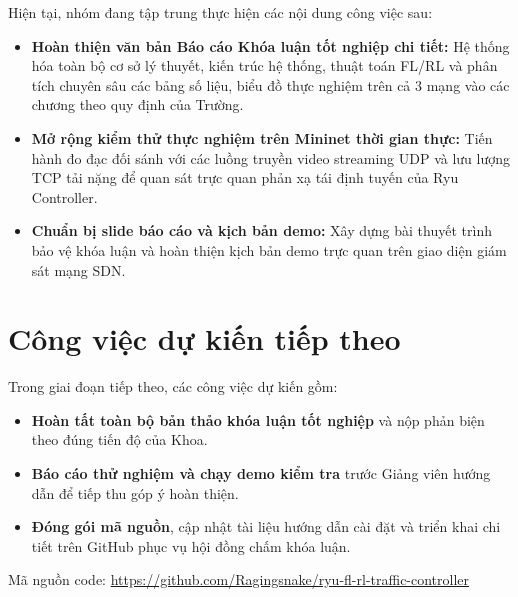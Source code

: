 \documentclass[11pt,a4paper]{article}
\begin{document}
Hiện tại, nhóm đang tập trung thực hiện các nội dung công việc sau:
\begin{itemize}[leftmargin=1.5em, itemsep=0.3ex]
    \item \textbf{Hoàn thiện văn bản Báo cáo Khóa luận tốt nghiệp chi tiết:} Hệ thống hóa toàn bộ cơ sở lý thuyết, kiến trúc hệ thống, thuật toán FL/RL và phân tích chuyên sâu các bảng số liệu, biểu đồ thực nghiệm trên cả 3 mạng vào các chương theo quy định của Trường.
    \item \textbf{Mở rộng kiểm thử thực nghiệm trên Mininet thời gian thực:} Tiến hành đo đạc đối sánh với các luồng truyền video streaming UDP và lưu lượng TCP tải nặng để quan sát trực quan phản xạ tái định tuyến của Ryu Controller.
    \item \textbf{Chuẩn bị slide báo cáo và kịch bản demo:} Xây dựng bài thuyết trình bảo vệ khóa luận và hoàn thiện kịch bản demo trực quan trên giao diện giám sát mạng SDN.
\end{itemize}

\section{Công việc dự kiến tiếp theo}

Trong giai đoạn tiếp theo, các công việc dự kiến gồm:
\begin{itemize}[leftmargin=1.5em, itemsep=0.3ex]
    \item \textbf{Hoàn tất toàn bộ bản thảo khóa luận tốt nghiệp} và nộp phản biện theo đúng tiến độ của Khoa.
    \item \textbf{Báo cáo thử nghiệm và chạy demo kiểm tra} trước Giảng viên hướng dẫn để tiếp thu góp ý hoàn thiện.
    \item \textbf{Đóng gói mã nguồn}, cập nhật tài liệu hướng dẫn cài đặt và triển khai chi tiết trên GitHub phục vụ hội đồng chấm khóa luận.
\end{itemize}

\vspace{0.4cm}
Mã nguồn code: \url{https://github.com/Ragingsnake/ryu-fl-rl-traffic-controller}
\end{document}
